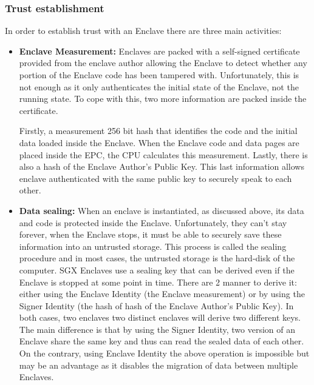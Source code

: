 \documentclass[../main.tex]{subfiles}
\begin{document}
\subsubsection{Trust establishment}
\label{section:theoric:trust_establishment}
\par In order to establish trust with an Enclave there are three main activities:
\begin{itemize}
    \item \textbf{Enclave Measurement:} Enclaves are packed with a self-signed certificate provided from the enclave author allowing the Enclave to detect whether any portion of the Enclave code has been tampered with. Unfortunately, this is not enough as it only authenticates the initial state of the Enclave, not the running state. To cope with this, two more information are packed inside the certificate.
    \par Firstly, a measurement 256 bit hash that identifies the code and the initial data loaded inside the Enclave. When the Enclave code and data pages are placed inside the EPC, the CPU calculates this measurement. Lastly, there is also a hash of the Enclave Author's Public Key. This last information allows enclave authenticated with the same public key to securely speak to each other.
    \item \textbf{Data sealing:} When an enclave is instantiated, as discussed above, its data and code is protected inside the Enclave. Unfortunately, they can't stay forever, when the Enclave stops, it must be able to securely save these information into an untrusted storage. This process is called the sealing procedure and in most cases, the untrusted storage is the hard-disk of the computer. SGX Enclaves use a sealing key that can be derived even if the Enclave is stopped at some point in time. There are 2 manner to derive it: either using the Enclave Identity (the Enclave measurement) or by using the Signer Identity (the hash of hash of the Enclave Author's Public Key). In both cases, two enclaves two distinct enclaves will derive two different keys. The main difference is that by using the Signer Identity, two version of an Enclave share the same key and thus can read the sealed data of each other. On the contrary, using Enclave Identity the above operation is impossible but may be an advantage as it disables the migration of data between multiple Enclaves.

\end{itemize}
\end{document}
